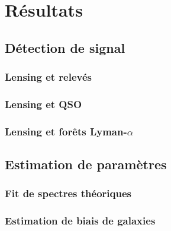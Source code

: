 
\chapter{Résultats} %

\label{Chapter8} %






\section{Détection de signal}
\subsection{Lensing et relevés}
\subsection{Lensing et QSO}
\subsection{Lensing et forêts Lyman-$\alpha$}

\section{Estimation de paramètres}
\subsection{Fit de spectres théoriques}
\subsection{Estimation de biais de galaxies}


